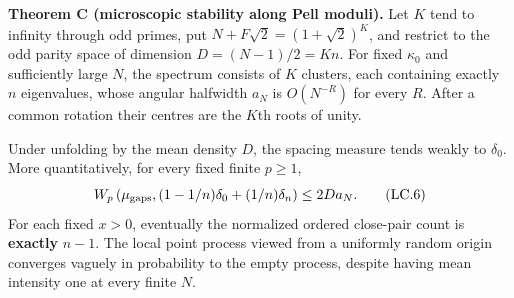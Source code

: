 \textbf{Theorem C (microscopic stability along Pell moduli).} Let \(K\) tend to infinity through odd primes, put \(N+F\sqrt2=(1+\sqrt2)^K\), and restrict to the odd parity space of dimension \(D=(N-1)/2=Kn\). For fixed \({\kappa_0}\) and sufficiently large \(N\), the spectrum consists of \(K\) clusters, each containing exactly \(n\) eigenvalues, whose angular halfwidth \(a_N\) is \(O(N^{-R})\) for every \(R\). After a common rotation their centres are the \(K\)th roots of unity.

Under unfolding by the mean density \(D\), the spacing measure tends weakly to \(\delta_0\). More quantitatively, for every fixed finite \(p\geq1\), \[
 W_p\left(\mu_{\rm gaps},(1-1/n)\delta_0+(1/n)\delta_n\right)
       \leq2Da_N.                                           \tag{LC.6}
\] For each fixed \(x>0\), eventually the normalized ordered close-pair count is \textbf{exactly} \(n-1\). The local point process viewed from a uniformly random origin converges vaguely in probability to the empty process, despite having mean intensity one at every finite \(N\).

